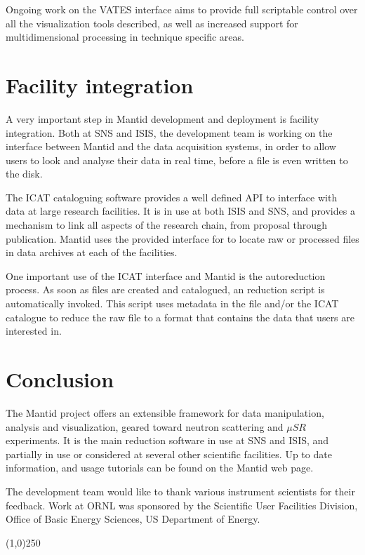 \documentclass{elsarticle}
\begin{document}
Ongoing work on the VATES interface aims to provide full scriptable control over all the visualization tools described, as well as increased support for multidimensional processing in technique specific areas. 

\section{Facility integration}
A very important step in Mantid development and deployment is facility integration. Both at SNS and ISIS, the development team is working on the interface between Mantid and the data acquisition systems, in order to allow users to look and analyse their data in real time, before a file is even written to the disk.

The ICAT cataloguing software provides a well defined API to interface with data at large research facilities. It is in use at both ISIS and SNS, and provides a mechanism to link all aspects of the research chain, from proposal through publication. Mantid uses the provided interface for to locate raw or processed files in data archives at each of the facilities.

One important use of the ICAT interface and Mantid is the autoreduction process. As soon as files are created and catalogued, an reduction script is automatically invoked. This script uses metadata in the file and/or the ICAT catalogue to reduce the raw file to a format that contains the data that users are interested in.   



\section{Conclusion}
The Mantid project offers an extensible framework for data manipulation, analysis and visualization, geared toward neutron scattering and $\mu SR$ experiments. It is the main reduction software in use at SNS and ISIS, and partially in use or considered at several other scientific facilities. Up to date information, and usage tutorials can be found on the Mantid web page\cite{webpage}. 

The development team would like to thank various instrument scientists for their feedback. Work at ORNL was sponsored by the Scientific User Facilities Division, Office of Basic Energy Sciences, US Department of Energy. 

\begin{center}
\line(1,0){250}
\end{center}
\end{document}
